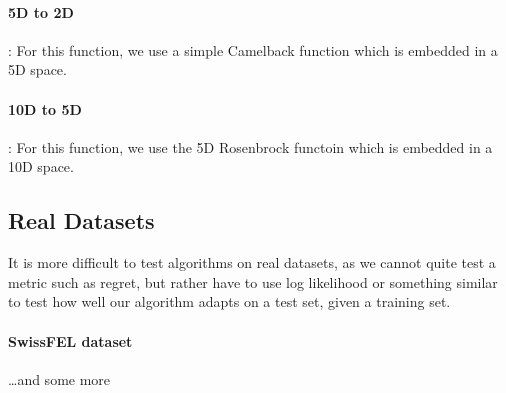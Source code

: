 \paragraph{5D to 2D}: For this function, we use a simple Camelback function which is embedded in a 5D space.
\paragraph{10D to 5D}: For this function, we use the 5D Rosenbrock functoin which is embedded in a 10D space.

\subsection{Real Datasets}
It is more difficult to test algorithms on real datasets, as we cannot quite test a metric such as regret, but rather have to use log likelihood or something similar to test how well our algorithm adapts on a test set, given a training set.

\paragraph{SwissFEL dataset}
\dots and some more 

